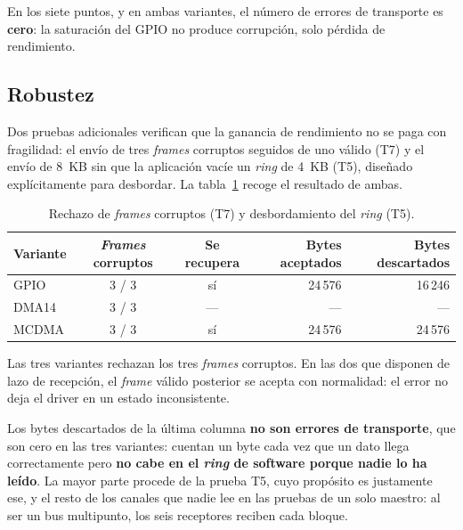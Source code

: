 En los siete puntos, y en ambas variantes, el número de errores de transporte es \textbf{cero}: la
saturación del GPIO no produce corrupción, solo pérdida de rendimiento.

\subsection{Robustez}

Dos pruebas adicionales verifican que la ganancia de rendimiento no se paga con fragilidad: el
envío de tres \textit{frames} corruptos seguidos de uno válido (T7) y el envío de 8~KB sin que la
aplicación vacíe un \textit{ring} de 4~KB (T5), diseñado explícitamente para desbordar. La
tabla~\ref{tab:bench_robustez} recoge el resultado de ambas.

\begin{table}[H]
    \centering
    \small
    \begin{tabular}{lccrr}
        \hline
        \textbf{Variante} & \textbf{\textit{Frames} corruptos} & \textbf{Se recupera} & \textbf{Bytes aceptados} & \textbf{Bytes descartados} \\
        \hline
        GPIO  & 3 / 3 & sí & 24\,576 & 16\,246 \\
        DMA14 & 3 / 3 & --- & --- & --- \\
        MCDMA & 3 / 3 & sí & 24\,576 & 24\,576 \\
        \hline
    \end{tabular}
    \caption{Rechazo de \textit{frames} corruptos (T7) y desbordamiento del \textit{ring} (T5).}
    \label{tab:bench_robustez}
\end{table}

Las tres variantes rechazan los tres \textit{frames} corruptos. En las dos que disponen de lazo de
recepción, el \textit{frame} válido posterior se acepta con normalidad: el error no deja el driver
en un estado inconsistente.

Los bytes descartados de la última columna \textbf{no son errores de transporte}, que son cero en
las tres variantes: cuentan un byte cada vez que un dato llega correctamente pero \textbf{no cabe
en el \textit{ring} de software porque nadie lo ha leído}. La mayor parte procede de la prueba T5,
cuyo propósito es justamente ese, y el resto de los canales que nadie lee en las pruebas de un
solo maestro: al ser un bus multipunto, los seis receptores reciben cada bloque.

